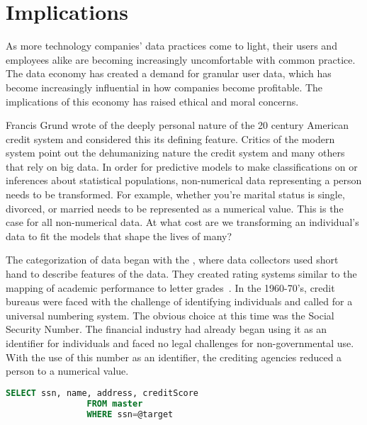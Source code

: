 \section{Implications}
As more technology companies' data practices come to light, their users and
employees alike are becoming increasingly uncomfortable with common practice.
The data economy has created a demand for granular user data, which has become
increasingly influential in how companies become profitable. The implications
of this economy has raised ethical and moral concerns.

Francis Grund wrote of the deeply personal nature of the 20 century
American credit system and considered this its defining feature. Critics of the
modern system point out the dehumanizing nature the credit system and many
others that rely on big data. In order for predictive models to make
classifications on or inferences about statistical populations, non-numerical
data representing a person needs to be transformed. For example, whether you're
marital status is single, divorced, or married needs to be represented as a
numerical value. This is the case for all non-numerical data. At what cost are
we transforming an individual's data to fit the models that shape the lives of
many?

The categorization of data began with the \mca, where data collectors used
short hand to describe features of the data. They created rating systems
similar to the mapping of academic performance to letter
grades~\cite{lauer2017creditworthy}. In the 1960-70's, credit bureaus were
faced with the challenge of identifying individuals and called for a universal
numbering system. The obvious choice at this time was the Social Security
Number. The financial industry had already began using it as an identifier for
individuals and faced no legal challenges for non-governmental use. With the
use of this number as an identifier, the crediting agencies reduced a person to
a numerical value.

\begin{lstlisting}[language=SQL, basicstyle=\sffamily]
		SELECT ssn, name, address, creditScore
				FROM master
				WHERE ssn=@target
\end{lstlisting}

